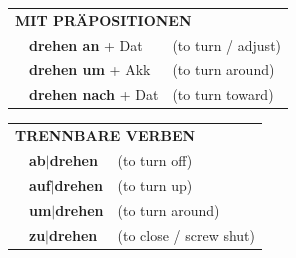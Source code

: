 \documentclass[10pt,a4paper]{revtex4-2}
\begin{document}
\begin{verbbox}
\vspace{10pt}

\begin{tabular}{lll}
\multicolumn{3}{l}{\textbf{MIT PRÄPOSITIONEN}}\\
& \textbf{drehen an} + Dat & (to turn / adjust)\\
& \textbf{drehen um} + Akk & (to turn around)\\
& \textbf{drehen nach} + Dat & (to turn toward)\\
\end{tabular}
\hfill
\begin{tabular}{lll}
\multicolumn{3}{l}{\textbf{TRENNBARE VERBEN}}\\
& \textbf{ab$|$drehen} & (to turn off)\\
& \textbf{auf$|$drehen} & (to turn up)\\
& \textbf{um$|$drehen} & (to turn around)\\
& \textbf{zu$|$drehen} & (to close / screw shut)\\
\end{tabular}
\vspace{-5pt}
\end{verbbox}
\end{document}
